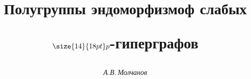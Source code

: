 

 




 


\newcommand{\End}{\operatorname{End}} 


\newcommand{\Eqv}{\operatorname{Eqv}} 


\newcommand{\Ins}{\operatorname{Ins}} 


\newcommand{\rP}{{\mathrm{P}\,}} 


\newcommand{\tts}[1]{} 


\renewcommand{\baselinestretch}{1.04}


 




\setcounter{page}{80} 












 


\author{\it А.В.\,Молчанов} 




\title{Полугруппы эндоморфизмоф слабых


$\size{14}{18pt}\selectfont p$-гиперграфов} 


 


\date{} 




\pagestyle{plain} %


 




